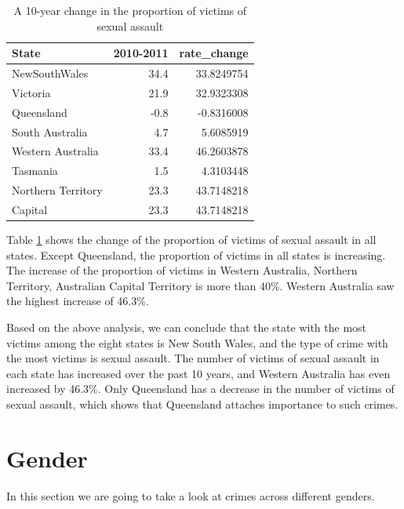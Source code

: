 \documentclass[11pt,a4paper,]{article}
\begin{document}
\begin{table}

\caption{\label{tab:table3}A 10-year change in the proportion of victims of sexual assault}
\centering
\begin{tabular}[t]{lrr}
\toprule
State & 2010-2011 & rate\_change\\
\midrule
NewSouthWales & 34.4 & 33.8249754\\
Victoria & 21.9 & 32.9323308\\
Queensland & -0.8 & -0.8316008\\
South Australia & 4.7 & 5.6085919\\
Western Australia & 33.4 & 46.2603878\\
\addlinespace
Tasmania & 1.5 & 4.3103448\\
Northern Territory & 23.3 & 43.7148218\\
Capital & 23.3 & 43.7148218\\
\bottomrule
\end{tabular}
\end{table}

Table \ref{tab:table3} shows the change of the proportion of victims of sexual assault in all states. Except Queensland, the proportion of victims in all states is increasing. The increase of the proportion of victims in Western Australia, Northern Territory, Australian Capital Territory is more than 40\%. Western Australia saw the highest increase of 46.3\%.

Based on the above analysis, we can conclude that the state with the most victims among the eight states is New South Wales, and the type of crime with the most victims is sexual assault. The number of victims of sexual assault in each state has increased over the past 10 years, and Western Australia has even increased by 46.3\%. Only Queensland has a decrease in the number of victims of sexual assault, which shows that Queensland attaches importance to such crimes.

\clearpage

\section*{Gender}

In this section we are going to take a look at crimes across different genders.
\end{document}
